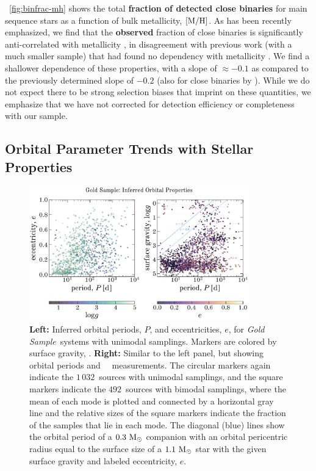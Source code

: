 \documentclass[modern]{aastex63}
\newcommand{\changes}[1]{{\bf\color{purple}#1}}
\newcommand{\goldsample}{\textit{Gold Sample}}
\newcommand{\ngold}{\ensuremath{1\,032}}
\newcommand{\nbimodal}{\ensuremath{492}}
\begin{document}
\figurename~\ref{fig:binfrac-mh} shows the total \changes{fraction of detected close binaries} for main
sequence stars as a function of bulk metallicity, ${[{\rm M}/{\rm H}]}$.
As has been recently emphasized, we find that the \changes{observed} fraction of close binaries is
significantly anti-correlated with metallicity \citep{Moe:2019, El-Badry:2019a},
in disagreement with previous work (with a much smaller sample) that had
found no dependency with metallicity \citep{Jenkins:2015}.
We find a shallower dependence of these properties, with a slope of $\approx
-0.1$ as compared to the previously determined slope of $-0.2$ (also for close
binaries by \citealt{Moe:2019}).
While we do not expect there to be strong selection biases that imprint on these
quantities, we emphasize that we have not corrected for detection efficiency or
completeness with our sample.


\subsection{Orbital Parameter Trends with Stellar Properties}
\label{sec:gold-sample}

\begin{figure}[!t]
    \begin{center}
    \includegraphics[width=0.85\textwidth]{Plogg_Pe.pdf}
    \end{center}
    \caption{%
    \textbf{Left:} Inferred orbital periods, $P$, and eccentricities, $e$, for
    \goldsample\ systems with unimodal samplings.
    Markers are colored by surface gravity, \logg.
    \textbf{Right:} Similar to the left panel, but showing orbital periods and
    \apogee\ \logg\ measurements.
    The circular markers again indicate the \ngold\ sources with unimodal
    samplings, and the square markers indicate the \nbimodal\ sources with
    bimodal samplings, where the mean of each mode is plotted and connected by a
    horizontal gray line and the relative sizes of the square markers indicate
    the fraction of the samples that lie in each mode.
    The diagonal (blue) lines show the orbital period of a $0.3~\mathrm{M}_\odot$ companion
    with an orbital pericentric radius equal to the surface size of a
    $1.1~\mathrm{M}_\odot$ star with the given surface gravity and labeled eccentricity,
    $e$.
    \label{fig:Plogg}
    }
\end{figure}
\end{document}
